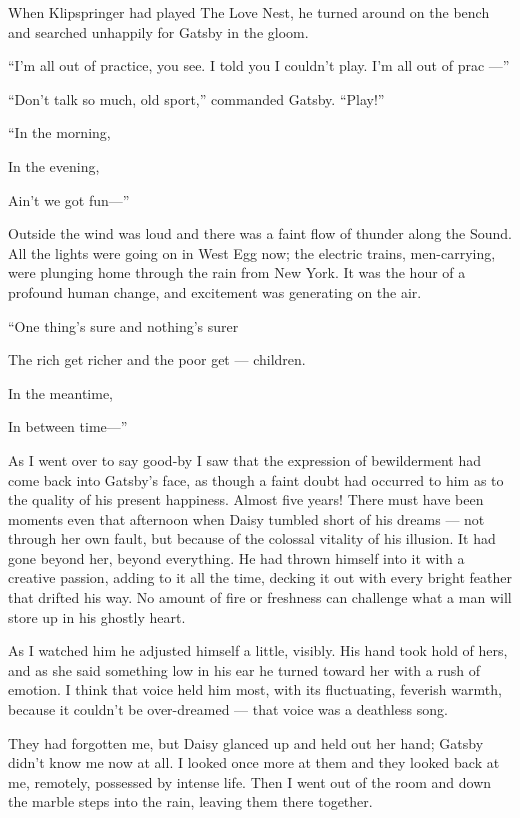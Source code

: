 \documentclass{znotebook}
\begin{document}
When Klipspringer had played The Love Nest, he turned around on the bench and searched unhappily for Gatsby in the gloom.

``I'm all out of practice, you see. I told you I couldn't play. I'm all out of prac ---''

``Don't talk so much, old sport,'' commanded Gatsby. ``Play!''

``In the morning,

In the evening,

Ain't we got fun---''

Outside the wind was loud and there was a faint flow of thunder along the Sound. All the lights were going on in West Egg now; the electric trains, men-carrying, were plunging home through the rain from New York. It was the hour of a profound human change, and excitement was generating on the air.

``One thing's sure and nothing's surer

The rich get richer and the poor get ---{} children.

In the meantime,

In between time---''

As I went over to say good-by I saw that the expression of bewilderment had come back into Gatsby's face, as though a faint doubt had occurred to him as to the quality of his present happiness. Almost five years! There must have been moments even that afternoon when Daisy tumbled short of his dreams ---{} not through her own fault, but because of the colossal vitality of his illusion. It had gone beyond her, beyond everything. He had thrown himself into it with a creative passion, adding to it all the time, decking it out with every bright feather that drifted his way. No amount of fire or freshness can challenge what a man will store up in his ghostly heart.

As I watched him he adjusted himself a little, visibly. His hand took hold of hers, and as she said something low in his ear he turned toward her with a rush of emotion. I think that voice held him most, with its fluctuating, feverish warmth, because it couldn't be over-dreamed ---{} that voice was a deathless song.

They had forgotten me, but Daisy glanced up and held out her hand; Gatsby didn't know me now at all. I looked once more at them and they looked back at me, remotely, possessed by intense life. Then I went out of the room and down the marble steps into the rain, leaving them there together.
\end{document}
